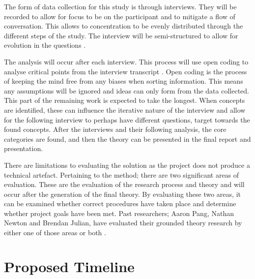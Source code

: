 \par The form of data collection for this study is through interviews. They will be recorded to allow for focus to be on the participant and to mitigate a flow of conversation. This allows to concentration to be evenly distributed through the different steps of the study. The interview will be semi-structured to allow for evolution in the questions \cite{geeks}. 
\newline
\par The analysis will occur after each interview. This process will use open coding to analyse critical points from the interview transcript \cite{geeks}. Open coding is the process of keeping the mind free from any biases when sorting information. This means any assumptions will be ignored and ideas can only form from the data collected. This part of the remaining work is expected to take the longest. When concepts are identified, these can influence the iterative nature of the interview and allow for the following interview to perhaps have different questions, target towards the found concepts. After the interviews and their following analysis, the core categories are found, and then the theory can be presented in the final report and presentation. 
\newline
\par 
There are limitations to evaluating the solution as the project does not produce a technical artefact. Pertaining to the method; there are two significant areas of evaluation. These are the evaluation of the research process and theory and will occur after the generation of the final theory. By evaluating these two areas, it can be examined whether correct procedures have taken place and determine whether project goals have been met. Past researchers; Aaron Pang, Nathan Newton and Brendan Julian, have evaluated their grounded theory research by either one of those areas or both \cite{nathan,2,pang}. 

\section{Proposed Timeline}

